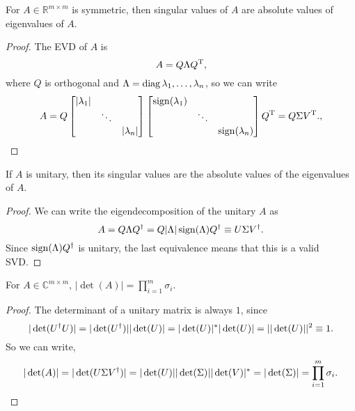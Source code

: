 \documentclass{article}
\begin{document}
\begin{theorem}
    For $A\in\mathbb{R}^{m\times m}$ is symmetric, then singular values of $A$ are absolute values of eigenvalues of $A$.
\end{theorem}
\begin{proof}
    The EVD of $A$ is
    \begin{equation}
        A=Q\Lambda Q^{\text{T}},
    \end{equation}
    where $Q$ is orthogonal and $\Lambda=\operatorname{diag}{\lambda_1,\dots,\lambda_n}$, so we can write
    \begin{equation}
        A=Q\begin{bmatrix}
            |\lambda_1| & & \\
            &          \ddots & \\
            & & |\lambda_n|
        \end{bmatrix}
        \begin{bmatrix}
            \operatorname{sign}(\lambda_1) & & \\
            &          \ddots & \\
            & & \operatorname{sign}(\lambda_n)
        \end{bmatrix}Q^{\text{T}}=Q\Sigma V^{\text{T}}.
        ,
    \end{equation}
\end{proof}

\begin{theorem}
    If $A$ is unitary, then its singular values are the absolute values of the eigenvalues of $A$.
\end{theorem}
\begin{proof}
    We can write the eigendecomposition of the unitary $A$ as 
    \begin{equation}
        A=Q\Lambda Q^{\dagger}=Q|\Lambda|\operatorname{sign}(\Lambda)Q^{\dagger}\equiv U\Sigma V^{\dagger}.
    \end{equation}
    Since $\operatorname{sign}(\Lambda)Q^{\dagger}$ is unitary, the last equivalence means that this is a valid SVD.
\end{proof}

\begin{theorem}
    For $A\in\mathbb{C}^{m\times m}$, $|\det(A)|=\prod_{i=1}^m\sigma_i$.
\end{theorem}
\begin{proof}
    The determinant of a unitary matrix is always $1$, since
    \begin{equation}
        |\det(U^{\dagger} U)|=|\det(U^{\dagger})||\det(U)|=|\det(U)|^*|\det(U)|=||\det(U)||^2\equiv 1.
    \end{equation}
    So we can write,
    \begin{equation}
        |\det(A)|=|\det(U\Sigma V^{\dagger})|=|\det(U)||\det(\Sigma)||\det(V)|^*=|\det(\Sigma)|=\prod_{i=1}^m\sigma_i.
    \end{equation}
\end{proof}
\end{document}
